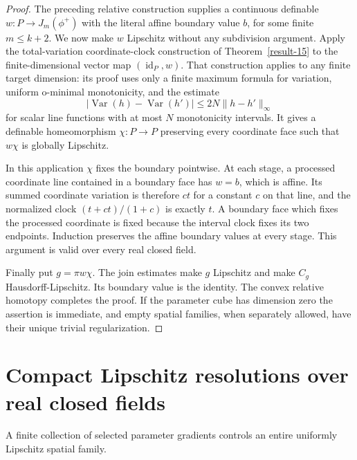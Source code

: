 \documentclass[11pt,a4paper]{article}
\theoremstyle{definition}
\begin{document}
\begin{proof}
The preceding relative construction supplies a continuous definable \(w:P\to J_m(\phi^+)\) with the literal affine boundary value \(b\), for some finite \(m\le k+2\). We now make \(w\) Lipschitz without any subdivision argument. Apply the total-variation coordinate-clock construction of Theorem~\ref{result-15} to the finite-dimensional vector map \((\operatorname{id}_P,w)\). That construction applies to any finite target dimension: its proof uses only a finite maximum formula for variation, uniform o-minimal monotonicity, and the estimate
\[
 |\operatorname{Var}(h)-\operatorname{Var}(h')|
       \le 2N\|h-h'\|_\infty
\]
for scalar line functions with at most \(N\) monotonicity intervals. It gives a definable homeomorphism \(\chi:P\to P\) preserving every coordinate face such that \(w\chi\) is globally Lipschitz.

In this application \(\chi\) fixes the boundary pointwise. At each stage, a processed coordinate line contained in a boundary face has \(w=b\), which is affine. Its summed coordinate variation is therefore \(ct\) for a constant \(c\) on that line, and the normalized clock \((t+ct)/(1+c)\) is exactly \(t\). A boundary face which fixes the processed coordinate is fixed because the interval clock fixes its two endpoints. Induction preserves the affine boundary values at every stage. This argument is valid over every real closed field.

Finally put \(g=\pi w\chi\). The join estimates make \(g\) Lipschitz and make \(C_g\) Hausdorff-Lipschitz. Its boundary value is the identity. The convex relative homotopy completes the proof. If the parameter cube has dimension zero the assertion is immediate, and empty spatial families, when separately allowed, have their unique trivial regularization.
\end{proof}



\section{Compact Lipschitz resolutions over real closed fields}
A finite collection of selected parameter gradients controls an entire uniformly Lipschitz spatial family.
\end{document}
